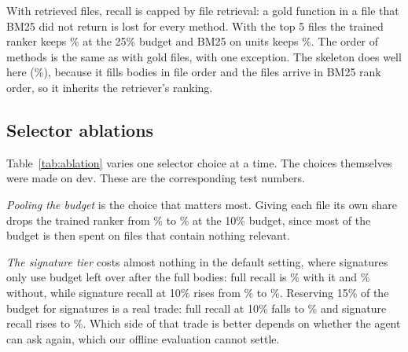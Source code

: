 With retrieved files, recall is capped by file retrieval: a gold function in a file that BM25 did not return is lost for every method. With the top 5 files the trained ranker keeps \% at the 25\% budget and BM25 on units keeps \%. The order of methods is the same as with gold files, with one exception. The skeleton does well here (\%), because it fills bodies in file order and the files arrive in BM25 rank order, so it inherits the retriever's ranking.

\subsection{Selector ablations}
\label{sec:ablation}

\begin{table}[t]
\caption{Selector variants on Lite (\%). ``Sig.'' is signature recall.}
\label{tab:ablation}
\centering
\scriptsize
\setlength{\tabcolsep}{2.5pt}
\end{table}

Table~\ref{tab:ablation} varies one selector choice at a time. The choices themselves were made on dev. These are the corresponding test numbers.

\emph{Pooling the budget} is the choice that matters most. Giving each file its own share drops the trained ranker from \% to \% at the 10\% budget, since most of the budget is then spent on files that contain nothing relevant.

\emph{The signature tier} costs almost nothing in the default setting, where signatures only use budget left over after the full bodies: full recall is \% with it and \% without, while signature recall at 10\% rises from \% to \%. Reserving 15\% of the budget for signatures is a real trade: full recall at 10\% falls to \% and signature recall rises to \%. Which side of that trade is better depends on whether the agent can ask again, which our offline evaluation cannot settle.

